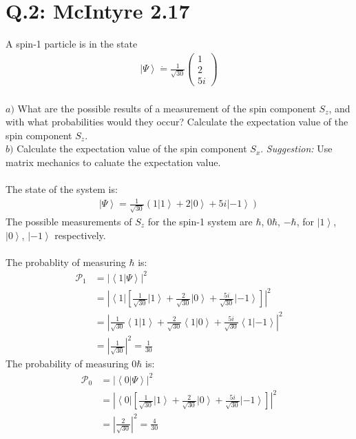 \documentclass[a4paper,12pt]{article}
\begin{document}
\section*{Q.2: McIntyre 2.17}
A spin-1 particle is in the state
\begin{align*}
\left|\Psi\right>\dot =\frac{1}{\sqrt{30}}\begin{pmatrix}
1\\
2\\
5i
\end{pmatrix}
\end{align*}\\
$a)$ What are the possible results of a measurement of the spin component $S_z$, and with what probabilities would they occur?  Calculate the expectation value of the spin component $S_z$.\\
$b)$ Calculate the expectation value of the spin component $S_x$. \textit{Suggestion:} Use matrix mechanics to caluate the expectation value.\\
\\
The state of the system is:
\begin{align*}
\left|\Psi\right>=\frac{1}{\sqrt{30}}(1\left|1\right>+2\left|0\right>+5i\left|-1\right>)
\end{align*}
The possible measurements of $S_z$ for the spin-1 system are $\hbar$, $0\hbar$, $-\hbar$, for $\left|1\right>$, $\left|0\right>$, $\left|-1\right>$ respectively.\\ \\
The probablity of measuring $\hbar$ is:
\begin{align*}
\mathcal{P}_1&=\left|\left<1\right.\left|\Psi\right>\right|^2\\
&=\left|\left<1\right|\left[\frac{1}{\sqrt{30}}\left|1\right>+\frac{2}{\sqrt{3  0}}\left|0\right>+\frac{5i}{\sqrt{30}}\left|-1\right>\right]\right|^2\\
&=\left|\frac{1}{\sqrt{30}}\left<1\right.\left|1\right>+\frac{2}{\sqrt{30}}\left<1\right.\left|0\right>+\frac{5i}{\sqrt{30}}\left<1\right.\left|-1\right>\right|^2\\
  &=\left|\frac{1}{\sqrt{30}}\right|^2=\frac{1}{30}
\end{align*}
The probability of measuring $0\hbar$ is:
\begin{align*}
\mathcal{P}_0&=\left|\left<0\right.\left|\Psi\right>\right|^2\\
&=\left|\left<0\right|\left[\frac{1}{\sqrt{30}}\left|1\right>+\frac{2}{\sqrt{3  0}}\left|0\right>+\frac{5i}{\sqrt{30}}\left|-1\right>\right]\right|^2\\
&=\left|\frac{2}{\sqrt{30}}\right|^2=\frac{4}{30}
\end{align*}
\end{document}
